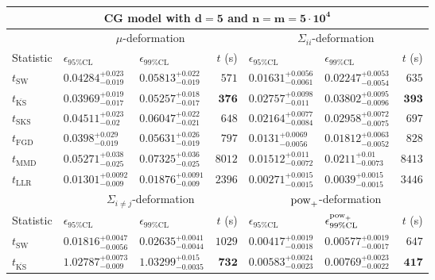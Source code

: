 \begin{tabular}{l|llr|llr}
	\toprule
	\multicolumn{7}{c}{{\bf CG model with $\mathbf{d=5}$ and $\mathbf{n=m=5\cdot 10^{4}}$}} \\
	\toprule
	\multicolumn{1}{c}{} & \multicolumn{3}{c}{$\mu$-deformation} & \multicolumn{3}{c}{$\Sigma_{ii}$-deformation} \\
	Statistic & $\epsilon_{95\%\mathrm{CL}}$ & $\epsilon_{99\%\mathrm    {CL}}$ & $t$ (s) & $\epsilon_{95\%\mathrm{CL}}$ & $\epsilon_{99\%\mathrm{CL}}$ & $t$ (s) \\
	\midrule
	$t_{\mathrm{SW}}$ & $0.04284_{-0.019}^{+0.023}$ & $0.05813_{-0.019}^{+0.022}$ & $571$ & $0.01631_{-0.0061}^{+0.0056}$ & $0.02247_{-0.0054}^{+0.0053}$ & $635$ \\
	$t_{\overline{\mathrm{KS}}}$ & ${\mathbf{0.03969_{-0.017}^{+0.019}}}$ & ${\mathbf{0.05257_{-0.017}^{+0.018}}}$ & ${\mathbf{376}}$ & $0.02757_{-0.011}^{+0.0098}$ & $0.03802_{-0.0096}^{+0.0095}$ & ${\mathbf{393}}$ \\
	$t_{\mathrm{SKS}}$ & $0.04511_{-0.02}^{+0.023}$ & $0.06047_{-0.021}^{+0.022}$ & $648$ & $0.02164_{-0.0084}^{+0.0077}$ & $0.02958_{-0.0075}^{+0.0072}$ & $697$ \\
	$t_{\mathrm{FGD}}$ & $0.0398_{-0.019}^{+0.029}$ & $0.05631_{-0.019}^{+0.026}$ & $797$ & ${\mathbf{0.0131_{-0.0056}^{+0.0069}}}$ & ${\mathbf{0.01812_{-0.0052}^{+0.0063}}}$ & $828$ \\
	$t_{\mathrm{MMD}}$ & $0.05271_{-0.025}^{+0.038}$ & $0.07325_{-0.025}^{+0.036}$ & $8012$ & $0.01512_{-0.0072}^{+0.011}$ & $0.0211_{-0.0073}^{+0.01}$ & $8413$ \\
	$t_{\mathrm{LLR}}$ & $0.01301_{-0.009}^{+0.0092}$ & $0.01876_{-0.009}^{+0.0091}$ & $2396$ & $0.00271_{-0.0015}^{+0.0015}$ & $0.0039_{-0.0015}^{+0.0015}$ & $3446$ \\
	\toprule
	\multicolumn{1}{c}{} & \multicolumn{3}{c}{$\Sigma_{i\neq j}$-deformation} & \multicolumn{3}{c}{$\rm{pow}_{+}$-deformation} \\
	Statistic & $\epsilon_{95\%\mathrm{CL}}$ & $\epsilon_{99\%\mathrm{CL}}$ & $t$ (s) & $\epsilon_{95\%\mathrm{CL}}$ & $\epsilon^{\rm   {pow}_{+}}_{99\%\mathrm{CL}}$ & $t$ (s) \\
	\midrule
	$t_{\mathrm{SW}}$ & $0.01816_{-0.0056}^{+0.0047}$ & $0.02635_{-0.0044}^{+0.0041}$ & $1029$ & $0.00417_{-0.0018}^{+0.0019}$ & $0.00577_{-0.0017}^{+0.0019}$ & $647$ \\
	$t_{\overline{\mathrm{KS}}}$ & $1.02787_{-0.009}^{+0.0073}$ & $1.03299_{-0.0035}^{+0.015}$ & ${\mathbf{732}}$ & $0.00583_{-0.0023}^{+0.0024}$ & $0.00769_{-0.0022}^{+0.0023}$ & ${\mathbf{417}}$ \\

\end{tabular}
